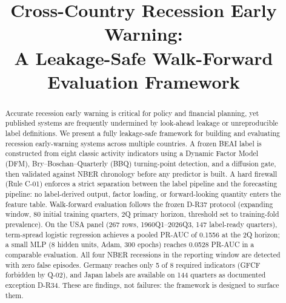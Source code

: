 \documentclass[conference]{IEEEtran}
\begin{document}
\title{Cross-Country Recession Early Warning:\\
A Leakage-Safe Walk-Forward Evaluation Framework}

\author{
\and
{}
\and
{}
}

\maketitle

\begin{abstract}
Accurate recession early warning is critical for policy and financial planning,
yet published systems are frequently undermined by look-ahead leakage or unreproducible
label definitions. We present a fully leakage-safe framework for building and evaluating
recession early-warning systems across multiple countries. A frozen BEAI label is
constructed from eight classic activity indicators using a Dynamic Factor Model
(DFM), Bry--Boschan--Quarterly (BBQ) turning-point detection, and a diffusion gate,
then validated against NBER chronology before any predictor is built. A hard firewall
(Rule C-01) enforces a strict separation between the label pipeline and the forecasting
pipeline: no label-derived output, factor loading, or forward-looking quantity
enters the feature table. Walk-forward evaluation follows the frozen D-R37 protocol
(expanding window, 80 initial training quarters, 2Q primary horizon, threshold
set to training-fold prevalence). On the USA panel (267 rows, 1960Q1--2026Q3,
147 label-ready quarters), term-spread logistic regression achieves a pooled
PR-AUC of 0.1556 at the 2Q horizon; a small MLP (8 hidden units, Adam, 300 epochs)
reaches 0.0528 PR-AUC in a comparable evaluation. All four NBER
recessions in the reporting window are detected with zero false episodes.
Germany reaches only 5 of 8 required indicators (GFCF forbidden by Q-02),
and Japan labels are available on 144 quarters as documented exception D-R34.
These are findings, not failures: the framework is designed to surface them.
\end{abstract}
\end{document}
